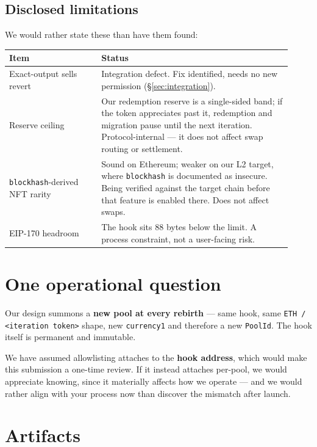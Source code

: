 \documentclass[11pt,a4paper]{article}
\newcommand{\code}[1]{\texttt{\small #1}}
\begin{document}
\subsection{Disclosed limitations}

We would rather state these than have them found:

\begin{center}\small
\begin{tabular}{@{}p{0.30\linewidth}p{0.62\linewidth}@{}}
\toprule
\textbf{Item} & \textbf{Status} \\
\midrule
Exact-output sells revert & Integration defect. Fix identified, needs no new permission (\S\ref{sec:integration}). \\
Reserve ceiling & Our redemption reserve is a single-sided band; if the token appreciates past it, redemption and migration pause until the next iteration. Protocol-internal --- it does not affect swap routing or settlement. \\
\code{blockhash}-derived NFT rarity & Sound on Ethereum; weaker on our L2 target, where \code{blockhash} is documented as insecure. Being verified against the target chain before that feature is enabled there. Does not affect swaps. \\
EIP-170 headroom & The hook sits 88 bytes below the limit. A process constraint, not a user-facing risk. \\
\bottomrule
\end{tabular}
\end{center}

\section{One operational question}

Our design summons a \textbf{new pool at every rebirth} --- same hook, same
\code{ETH / <iteration token>} shape, new \code{currency1} and therefore a new
\code{PoolId}. The hook itself is permanent and immutable.

We have assumed allowlisting attaches to the \textbf{hook address}, which would
make this submission a one-time review. If it instead attaches per-pool, we would
appreciate knowing, since it materially affects how we operate --- and we would
rather align with your process now than discover the mismatch after launch.

\section{Artifacts}
\end{document}
